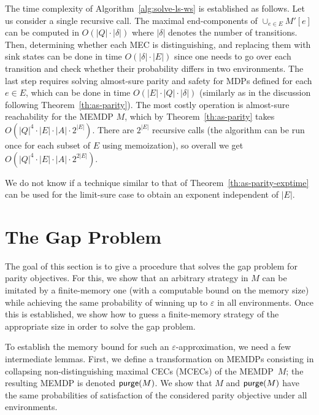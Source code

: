 \documentclass[a4paper,USenglish,cleveref, autoref, thm-restate]{lipics-v2021}
\let\epsilon\varepsilon
\def\abs#1{\ensuremath{\lvert #1 \rvert}}
\newcommand\purge[1]{\textrm{\sf purge}(#1)}
\begin{document}
The time complexity of Algorithm~\ref{alg:solve-ls-ws} is established as follows. 
Let us consider a single recursive call.
The maximal end-components of $\cup_{e \in E} M'[e]$ can be computed
in $O(\abs{Q}\cdot\abs{\delta})$ where $\abs{\delta}$ denotes the number of transitions. Then, determining whether each MEC is distinguishing, and replacing them with sink states can be done in time $O(\abs{\delta}\cdot \abs{E})$
since one needs to go over each transition and check whether their probability differs in two  environments. The last step requires solving almost-sure parity and safety for MDPs defined for each $e \in E$, which can be done in time $O(\abs{E}\cdot \abs{Q}\cdot \abs{\delta})$
(similarly as in the discussion following Theorem~\ref{th:as-parity}).
The most costly operation is almost-sure reachability for the MEMDP $M$, which 
by Theorem~\ref{th:as-parity} takes 
$O(\abs{Q}^4\cdot \abs{E}\cdot \abs{A}\cdot 2^{\abs{E}})$.
There are $2^{\abs{E}}$ recursive calls
(the algorithm can be run once for each subset of $E$ using memoization),
so overall 
we get $O(\abs{Q}^4\cdot \abs{E}\cdot \abs{A}\cdot 2^{2\abs{E}})$. 



We do not know if a technique similar to that of Theorem~\ref{th:as-parity-exptime} can be used for the limit-sure case to obtain an exponent independent of $\abs{E}$.




	\section{The Gap Problem}\label{section:quantitative}
	The goal of this section is to give a procedure that solves the gap problem for parity objectives.
	For this, we show that an arbitrary strategy in $M$ can be imitated by a finite-memory one (with a computable bound on the memory size) 
	while achieving the same probability of winning up to $\epsilon$ in all environments.
	Once this is established, we show how to guess a finite-memory strategy of the appropriate size in order to solve the gap problem.
	


To establish the memory bound for such an $\epsilon$-approximation, we need a few intermediate lemmas. First, we define a transformation on MEMDPs 
consisting in collapsing non-distinguishing maximal CECs (MCECs) of the MEMDP~$M$; the resulting MEMDP is denoted $\purge{M}$.
We show that $M$ and $\purge{M}$ have the same probabilities of satisfaction of the considered parity objective under all environments.
\end{document}
